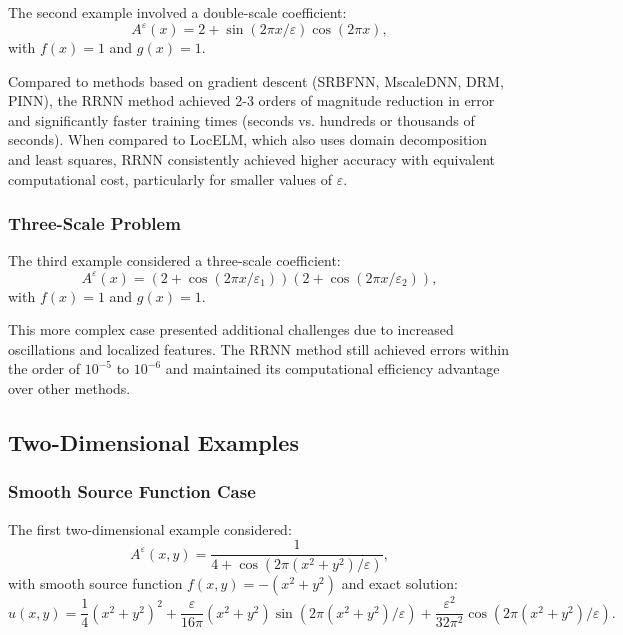 \documentclass[11pt]{article}
\begin{document}
The second example involved a double-scale coefficient:
\begin{equation}
A^{\varepsilon}(x) = 2 + \sin(2\pi x/\varepsilon) \cos(2\pi x),
\end{equation}
with $f(x) = 1$ and $g(x) = 1$.

Compared to methods based on gradient descent (SRBFNN, MscaleDNN, DRM, PINN), the RRNN method achieved 2-3 orders of magnitude reduction in error and significantly faster training times (seconds vs. hundreds or thousands of seconds). When compared to LocELM, which also uses domain decomposition and least squares, RRNN consistently achieved higher accuracy with equivalent computational cost, particularly for smaller values of $\varepsilon$.

\subsubsection{Three-Scale Problem}

The third example considered a three-scale coefficient:
\begin{equation}
A^{\varepsilon}(x) = (2 + \cos(2\pi x/\varepsilon_1))(2 + \cos(2\pi x/\varepsilon_2)),
\end{equation}
with $f(x) = 1$ and $g(x) = 1$.

This more complex case presented additional challenges due to increased oscillations and localized features. The RRNN method still achieved errors within the order of $10^{-5}$ to $10^{-6}$ and maintained its computational efficiency advantage over other methods.

\subsection{Two-Dimensional Examples}

\subsubsection{Smooth Source Function Case}

The first two-dimensional example considered:
\begin{equation}
A^{\varepsilon}(x, y) = \frac{1}{4 + \cos(2\pi(x^2+y^2)/\varepsilon)},
\end{equation}
with smooth source function $f(x, y) = -(x^2+y^2)$ and exact solution:
\begin{equation}
u(x, y) = \frac{1}{4}(x^2+y^2)^2 + \frac{\varepsilon}{16\pi}(x^2+y^2) \sin(2\pi(x^2+y^2)/\varepsilon) + \frac{\varepsilon^2}{32\pi^2}\cos(2\pi(x^2+y^2)/\varepsilon).
\end{equation}
\end{document}
